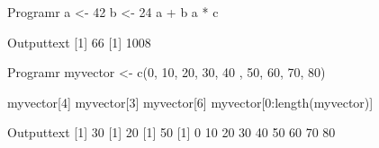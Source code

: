 
\begin{code}
    {Program}{r}
a <- 42
b <- 24
a + b
a * c
\end{code}
\begin{code}
    {Output}{text}
[1] 66
[1] 1008
\end{code}

\begin{code}
    {Program}{r}
myvector <- c(0, 10, 20, 30, 40 , 50, 60, 70, 80)

myvector[4]
myvector[3]
myvector[6]
myvector[0:length(myvector)]
\end{code}
\begin{code}
    {Output}{text}
[1] 30
[1] 20
[1] 50
[1]  0 10 20 30 40 50 60 70 80
\end{code}
